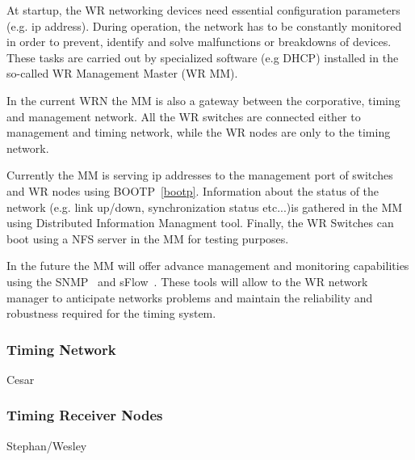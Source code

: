 At startup, the WR networking devices need essential configuration parameters (e.g. ip
address). During operation, the network has to be constantly monitored in
order to prevent, identify and solve malfunctions or breakdowns of devices. 
These tasks are carried out by specialized software (e.g DHCP) installed in the
so-called WR Management Master (WR MM). 

In the current WRN the MM is also a gateway between the corporative, timing and management 
network. All the WR switches are connected either to management and timing
network, while the WR nodes are only to the timing network. 

Currently the MM is serving ip addresses to the management port of switches and WR
nodes using BOOTP~\ref{bootp}. Information about the status of the network (e.g.
link up/down, synchronization status etc...)is gathered in the MM using Distributed Information Managment
tool. Finally, the WR Switches can boot using a NFS server in the MM for testing
purposes. 

In the future the MM will offer advance management and monitoring capabilities
using the SNMP~\cite{snmp} and sFlow~\cite{sflow}. These tools will allow to the 
WR network manager to anticipate networks problems and maintain the reliability
and robustness required for the timing system.


\subsubsection{Timing Network}

Cesar

\subsubsection{Timing Receiver Nodes}

Stephan/Wesley


